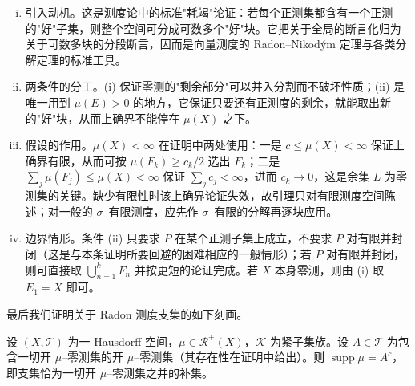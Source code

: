 \documentclass[../../main.tex]{subfiles}%
\begin{document}
\begin{remark}\label{remark:ch01-穷尽引理注}
\begin{enumerate}[(i)]
\item 引入动机。这是测度论中的标准"耗竭"论证：若每个正测集都含有一个正测的"好"子集，则整个空间可分成可数多个"好"块。它把关于全局的断言化归为关于可数多块的分段断言，因而是向量测度的 Radon--Nikodým 定理与各类分解定理的标准工具。
\item 两条件的分工。(i) 保证零测的"剩余部分"可以并入分割而不破坏性质；(ii) 是唯一用到 $\mu(E)>0$ 的地方，它保证只要还有正测度的剩余，就能取出新的"好"块，从而上确界不能停在 $\mu(X)$ 之下。
\item 假设的作用。$\mu(X)<\infty$ 在证明中两处使用：一是 $c\leqslant\mu(X)<\infty$ 保证上确界有限，从而可按 $\mu(F_k)\geqslant c_k/2$ 选出 $F_k$；二是 $\sum_j\mu(F_j)\leqslant\mu(X)<\infty$ 保证 $\sum_jc_j<\infty$，进而 $c_k\to0$，这是余集 $L$ 为零测集的关键。缺少有限性时该上确界论证失效，故引理只对有限测度空间陈述；对一般的 $\sigma$--有限测度，应先作 $\sigma$--有限的分解再逐块应用。
\item 边界情形。条件 (ii) 只要求 $P$ 在某个正测子集上成立，不要求 $P$ 对有限并封闭（这是与本条证明所要回避的困难相应的一般情形）；若 $P$ 对有限并封闭，则可直接取 $\bigcup_{n=1}^kF_n$ 并按更短的论证完成。若 $X$ 本身零测，则由 (i) 取 $E_1=X$ 即可。
\end{enumerate}
\end{remark}

最后我们证明关于 Radon 测度支集的如下刻画。

\begin{lemma}\label{lemma:ch01-支集刻画}
设 $(X,\mathcal{T})$ 为一 Hausdorff 空间，$\mu\in\mathcal{R}^+(X)$，$\mathcal{K}$ 为紧子集族。设 $A\in\mathcal{T}$ 为包含一切开 $\mu$--零测集的开 $\mu$--零测集（其存在性在证明中给出）。则 $\operatorname{supp}\mu=A^c$，即支集恰为一切开 $\mu$--零测集之并的补集。
\end{lemma}
\end{document}

